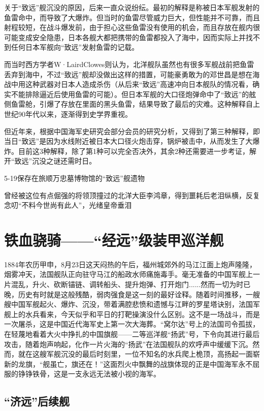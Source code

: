 \documentclass[12pt,UTF8]{ctexbook}
\begin{document}
关于“致远”舰沉没的原因，后来一直众说纷纭。最初的解释是称被日本军舰发射的鱼雷命中，而导致了大爆炸。但当时的鱼雷尽管威力巨大，但性能并不可靠，而且射程较短，在战斗爆发前，由于担心这些鱼雷没有使用的机会，而且存放在舰内很可能变成安全隐患，日本各舰大都把携带的鱼雷都投入了海中，因而实际上并找不到任何日本军舰向“致远”发射鱼雷的记载。

而当时西方学者W·LairdClowes则认为，北洋舰队虽然也有很多军舰战前把鱼雷丢弃到海中，不过“致远”舰却没做出这样的措置，可能豪勇敢为的邓世昌是想在海战中用这种武器对日本人造成杀伤（从后来“致远”高速冲向日本舰队的情况看，确实不能排除逼近后使用鱼雷的可能）。但日本军舰的大口径炮弹命中了“致远”的舷侧鱼雷舱，引爆了存放在里面的黑头鱼雷，结果导致了最后的灾难。这种解释自上世纪90年代以来，逐渐得到史学界重视。

但近年来，根据中国海军史研究会部分会员的研究分析，又得到了第三种解释，即当日“致远”是因为水线附近被日本大口径火炮击穿，锅炉被击中，从而发生了大爆炸。目前这3种解释，除了第1种可以完全否决外，其余2种还需要进一步考证，解开“致远”沉没之谜还需时日。

5-19保存在旅顺万忠墓博物馆的“致远”舰遗物

曾经被这位有点倔强的将领顶撞过的北洋大臣李鸿章，得到噩耗后老泪纵横，反复念叨“不料今世尚有此人”，光绪皇帝垂泪

\chapter{铁血骁骑——“经远”级装甲巡洋舰}

1884年农历甲申，8月23日这天闷热的午后，福州城郊外的马江江面上炮声隆隆，烟雾冲天，法国舰队正向驻守马江的船政水师痛施毒手。毫无准备的中国军舰上一片混乱，升火、砍断锚链、调转船头、提升炮弹、打开炮门......然而一切为时已晚，历史有时就是这般残酷，弱肉强食是这一刻的最好诠释。随着时间推移，一艘艘中国军舰起火、爆炸、沉没，带着满腔悲愤和遗憾与江畔的罗星塔诀别，法国军舰上的水兵看来，今天似乎和平日的打靶操演没什么区别。这不是一场战斗，而是一次屠杀，这是中国近代海军史上第一次大海葬。“窝尔达”号上的法国司令孤拔，在轻蔑地看着大火中挣扎的中国旗舰——二等巡洋舰“扬武”号，下令向其进行最后攻击，随着炮声响起，化作一片火海的“扬武”在法国舰队的欢呼声中缓缓下沉。然而，就在这艘军舰沉没的最后时刻里，一位不知名的水兵爬上桅顶，高扬起一面崭新的龙旗，“舰虽亡，旗还在！”这面烈火中飘舞的战旗体现的正是中国海军永不屈服的铮铮铁骨，这是一支永远无法被小视的海军。

\section{“济远”后续舰}
\end{document}
